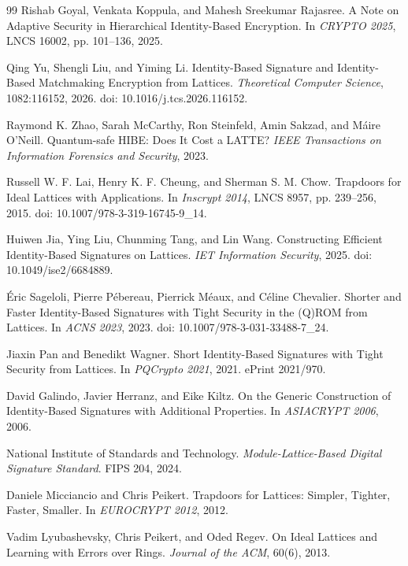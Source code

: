\documentclass[UTF8,a4paper,12pt,oneside,openany,fontset=fandol]{ctexrep}
\begin{document}
\begin{thebibliography}{99}
Rishab Goyal, Venkata Koppula, and Mahesh Sreekumar Rajasree.
A Note on Adaptive Security in Hierarchical Identity-Based Encryption.
In \emph{CRYPTO 2025}, LNCS 16002, pp. 101--136, 2025.

Qing Yu, Shengli Liu, and Yiming Li.
Identity-Based Signature and Identity-Based Matchmaking Encryption from Lattices.
\emph{Theoretical Computer Science}, 1082:116152, 2026.
doi: 10.1016/j.tcs.2026.116152.

Raymond K. Zhao, Sarah McCarthy, Ron Steinfeld, Amin Sakzad, and Máire O'Neill.
Quantum-safe HIBE: Does It Cost a LATTE?
\emph{IEEE Transactions on Information Forensics and Security}, 2023.

Russell W. F. Lai, Henry K. F. Cheung, and Sherman S. M. Chow.
Trapdoors for Ideal Lattices with Applications.
In \emph{Inscrypt 2014}, LNCS 8957, pp. 239--256, 2015.
doi: 10.1007/978-3-319-16745-9\_14.

Huiwen Jia, Ying Liu, Chunming Tang, and Lin Wang.
Constructing Efficient Identity-Based Signatures on Lattices.
\emph{IET Information Security}, 2025.
doi: 10.1049/ise2/6684889.

Éric Sageloli, Pierre Pébereau, Pierrick Méaux, and Céline Chevalier.
Shorter and Faster Identity-Based Signatures with Tight Security in the (Q)ROM from Lattices.
In \emph{ACNS 2023}, 2023.
doi: 10.1007/978-3-031-33488-7\_24.

Jiaxin Pan and Benedikt Wagner.
Short Identity-Based Signatures with Tight Security from Lattices.
In \emph{PQCrypto 2021}, 2021.
ePrint 2021/970.

David Galindo, Javier Herranz, and Eike Kiltz.
On the Generic Construction of Identity-Based Signatures with Additional Properties.
In \emph{ASIACRYPT 2006}, 2006.

National Institute of Standards and Technology.
\emph{Module-Lattice-Based Digital Signature Standard}.
FIPS 204, 2024.

Daniele Micciancio and Chris Peikert.
Trapdoors for Lattices: Simpler, Tighter, Faster, Smaller.
In \emph{EUROCRYPT 2012}, 2012.

Vadim Lyubashevsky, Chris Peikert, and Oded Regev.
On Ideal Lattices and Learning with Errors over Rings.
\emph{Journal of the ACM}, 60(6), 2013.


\end{thebibliography}
\end{document}
